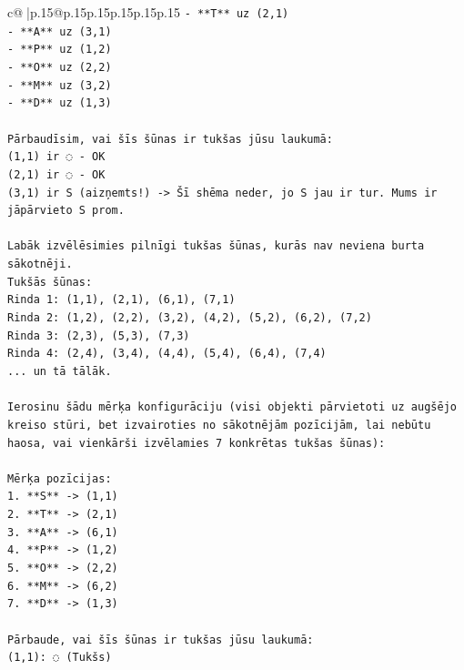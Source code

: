 \documentclass{article}
\begin{document}
{\begin{supertabular}{c@{$\;$}|p{.15\linewidth}@{}p{.15\linewidth}p{.15\linewidth}p{.15\linewidth}p{.15\linewidth}p{.15\linewidth}}
{{{\texttt{{-} **T** uz (2,1)} \\
\texttt{{-} **A** uz (3,1)} \\
\texttt{{-} **P** uz (1,2)} \\
\texttt{{-} **O** uz (2,2)} \\
\texttt{{-} **M** uz (3,2)} \\
\texttt{{-} **D** uz (1,3)} \\
\\ 
\texttt{Pārbaudīsim, vai šīs šūnas ir tukšas jūsu laukumā:} \\
\texttt{(1,1) ir ◌ {-} OK} \\
\texttt{(2,1) ir ◌ {-} OK} \\
\texttt{(3,1) ir S (aizņemts!) {-}> Šī shēma neder, jo S jau ir tur. Mums ir jāpārvieto S prom.} \\
\\ 
\texttt{Labāk izvēlēsimies pilnīgi tukšas šūnas, kurās nav neviena burta sākotnēji.} \\
\texttt{Tukšās šūnas:} \\
\texttt{Rinda 1: (1,1), (2,1), (6,1), (7,1)} \\
\texttt{Rinda 2: (1,2), (2,2), (3,2), (4,2), (5,2), (6,2), (7,2)} \\
\texttt{Rinda 3: (2,3), (5,3), (7,3)} \\
\texttt{Rinda 4: (2,4), (3,4), (4,4), (5,4), (6,4), (7,4)} \\
\texttt{... un tā tālāk.} \\
\\ 
\texttt{Ierosinu šādu mērķa konfigurāciju (visi objekti pārvietoti uz augšējo kreiso stūri, bet izvairoties no sākotnējām pozīcijām, lai nebūtu haosa, vai vienkārši izvēlamies 7 konkrētas tukšas šūnas):} \\
\\ 
\texttt{Mērķa pozīcijas:} \\
\texttt{1. **S** {-}> (1,1)} \\
\texttt{2. **T** {-}> (2,1)} \\
\texttt{3. **A** {-}> (6,1)} \\
\texttt{4. **P** {-}> (1,2)} \\
\texttt{5. **O** {-}> (2,2)} \\
\texttt{6. **M** {-}> (6,2)} \\
\texttt{7. **D** {-}> (1,3)} \\
\\ 
\texttt{Pārbaude, vai šīs šūnas ir tukšas jūsu laukumā:} \\
\texttt{(1,1): ◌ (Tukšs)} \\
}}}
\end{supertabular}}
\end{document}
